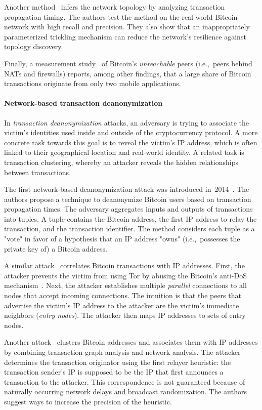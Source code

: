 Another method~\cite{Neudecker2016} infers the network topology by analyzing transaction propagation timing.
The authors test the method on the real-world Bitcoin network with high recall and precision.
They also show that an inappropriately parameterized trickling mechanism can reduce the network's resilience against topology discovery.

Finally, a measurement study~\cite{Wang2017} of Bitcoin's \textit{unreachable} peers (i.e.,~peers behind NATs and firewalls) reports, among other findings, that a large share of Bitcoin transactions originate from only two mobile applications.


\paragraph{Network-based transaction deanonymization}

In \textit{transaction deanonymization} attacks, an adversary is trying to associate the victim's identities used inside and outside of the cryptocurrency protocol.
A more concrete task towards this goal is to reveal the victim's IP address, which is often linked to their geographical location and real-world identity.
A related task is transaction clustering, whereby an attacker reveals the hidden relationships between transactions.

The first network-based deanonymization attack was introduced in~2014~\cite{Koshy2014}.
The authors propose a technique to deanonymize Bitcoin users based on transaction propagation times.
The adversary aggregates inputs and outputs of transactions into tuples.
A tuple contains the Bitcoin address, the first IP address to relay the transaction, and the transaction identifier.
The method considers each tuple as a "vote" in favor of a hypothesis that an IP address "owns" (i.e.,~possesses the private key of) a Bitcoin address.

A similar attack~\cite{Biryukov2014} correlates Bitcoin transactions with IP addresses.
First, the attacker prevents the victim from using Tor by abusing the Bitcoin's anti-DoS mechanism~\cite{Biryukov2015}.
Next, the attacker establishes multiple \textit{parallel} connections to all nodes that accept incoming connections.
The intuition is that the peers that advertise the victim's IP address to the attacker are the victim's immediate neighbors (\textit{entry nodes}).
The attacker then maps IP addresses to sets of entry nodes.

Another attack~\cite{Neudecker2017} clusters Bitcoin addresses and associates them with IP addresses by combining transaction graph analysis and network analysis.
The attacker determines the transaction originator using the first relayer heuristic: the transaction sender's IP is supposed to be the IP that first announces a transaction to the attacker.
This correspondence is not guaranteed because of naturally occurring network delays and broadcast randomization.
The authors suggest ways to increase the precision of the heuristic.


